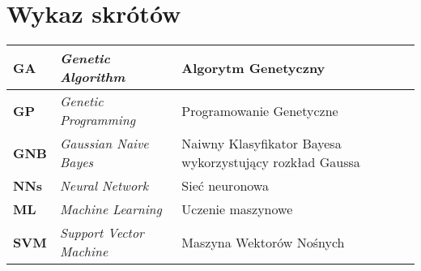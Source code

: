 \section*{Wykaz skrótów}

\begin{table}[H]
    \centering
    \begin{tabularx}{\linewidth}{lXX}
        \textbf{GA} & \textit{Genetic Algorithm} & Algorytm Genetyczny \\ \hline
        \textbf{GP} & \textit{Genetic Programming} & Programowanie Genetyczne \\ \hline
        \textbf{GNB} & \textit{Gaussian Naive Bayes} & Naiwny Klasyfikator Bayesa wykorzystujący rozkład Gaussa \\ \hline
        \textbf{NNs} & \textit{Neural Network} & Sieć neuronowa \\ \hline
        \textbf{ML} & \textit{Machine Learning} & Uczenie maszynowe \\ \hline
        \textbf{SVM} & \textit{Support Vector Machine} & Maszyna Wektorów Nośnych \\
    \end{tabularx}
    \label{tab:shorts}
\end{table}